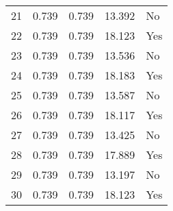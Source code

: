 \begin{tabular}{lrrll}
21 &                 0.739 &             0.739 &               13.392 &   No \\
22 &                 0.739 &             0.739 &               18.123 &  Yes \\
23 &                 0.739 &             0.739 &               13.536 &   No \\
24 &                 0.739 &             0.739 &               18.183 &  Yes \\
25 &                 0.739 &             0.739 &               13.587 &   No \\
26 &                 0.739 &             0.739 &               18.117 &  Yes \\
27 &                 0.739 &             0.739 &               13.425 &   No \\
28 &                 0.739 &             0.739 &               17.889 &  Yes \\
29 &                 0.739 &             0.739 &               13.197 &   No \\
30 &                 0.739 &             0.739 &               18.123 &  Yes \\
\bottomrule
\end{tabular}
